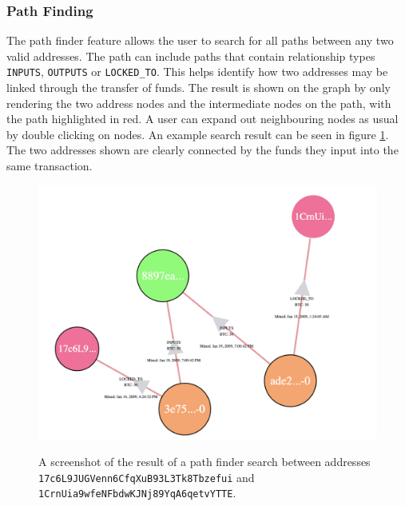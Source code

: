 \subsubsection{Path Finding}
The path finder feature allows the user to search for all paths between any two valid addresses. The path can include paths that contain relationship types \texttt{INPUTS}, \texttt{OUTPUTS} or \texttt{LOCKED_TO}. This helps identify how two addresses may be linked through the transfer of funds. The result is shown on the graph by only rendering the two address nodes and the intermediate nodes on the path, with the path highlighted in red. A user can expand out neighbouring nodes as usual by double clicking on nodes. An example search result can be seen in figure \ref{fig:path-search-result}. The two addresses shown are clearly connected by the funds they input into the same transaction. 

\begin{figure}[h!]
  \centering
  \includegraphics[width = 15cm]{./figures/ui-screenshots/path-find-result}\\[0.5cm] 
  \caption{A screenshot of the result of a path finder search between addresses \texttt{17c6L9JUGVenn6CfqXuB93L3Tk8Tbzefui} and \texttt{1CrnUia9wfeNFbdwKJNj89YqA6qetvYTTE}.}
  \label{fig:path-search-result}
\end{figure}




